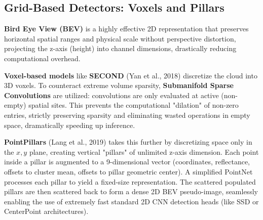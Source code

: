 \subsection{Grid-Based Detectors: Voxels and Pillars}
\textbf{Bird Eye View (BEV)} is a highly effective 2D representation that preserves horizontal spatial ranges and physical scale without perspective distortion, projecting the z-axis (height) into channel dimensions, drastically reducing computational overhead.

\textbf{Voxel-based models} like \textbf{SECOND} (Yan et al., 2018) discretize the cloud into 3D voxels. To counteract extreme volume sparsity, \textbf{Submanifold Sparse Convolutions} are utilized: convolutions are only evaluated at active (non-empty) spatial sites. This prevents the computational "dilation" of non-zero entries, strictly preserving sparsity and eliminating wasted operations in empty space, dramatically speeding up inference.

\textbf{PointPillars} (Lang et al., 2019) takes this further by discretizing space only in the $x,y$ plane, creating vertical "pillars" of unlimited z-axis dimension. Each point inside a pillar is augmented to a 9-dimensional vector (coordinates, reflectance, offsets to cluster mean, offsets to pillar geometric center). A simplified PointNet processes each pillar to yield a fixed-size representation. The scattered populated pillars are then scattered back to form a dense 2D BEV pseudo-image, seamlessly enabling the use of extremely fast standard 2D CNN detection heads (like SSD or CenterPoint architectures).

